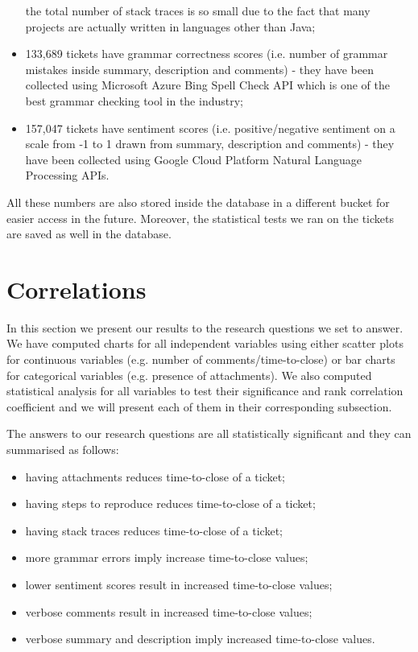 \documentclass{mpaper}
\begin{document}
\begin{itemize}
  the total number of stack traces is so small due to the fact that many projects are actually written in languages other than Java;
  \item 133,689 tickets have grammar correctness scores (i.e. number of grammar mistakes inside summary, description and comments) - 
  they have been collected using Microsoft Azure Bing Spell Check API which is one of the best grammar checking tool in the industry; 
  \item 157,047 tickets have sentiment scores (i.e. positive/negative sentiment on a scale from -1 to 1 drawn from summary, description
  and comments) - they have been collected using Google Cloud Platform Natural Language Processing APIs.
\end{itemize}

All these numbers are also stored inside the database in a different bucket for easier access in the future. Moreover, the statistical 
tests we ran on the tickets are saved as well in the database.

\section{Correlations}\label{correlations}

In this section we present our results to the research questions we set to answer. We have computed charts for all 
independent variables using either scatter plots for continuous variables (e.g. number of comments/time-to-close) 
or bar charts for categorical variables (e.g. presence of attachments). We also computed statistical analysis for 
all variables to test their significance and rank correlation coefficient and we will present each of them in their 
corresponding subsection. 

The answers to our research questions are all statistically significant and they can summarised as follows:
\begin{itemize}
  \item having attachments reduces time-to-close of a ticket;
  \item having steps to reproduce reduces time-to-close of a ticket;
  \item having stack traces reduces time-to-close of a ticket;
  \item more grammar errors imply increase time-to-close values;
  \item lower sentiment scores result in increased time-to-close values;
  \item verbose comments result in increased time-to-close values;
  \item verbose summary and description imply increased time-to-close values.
\end{itemize}
\end{document}
